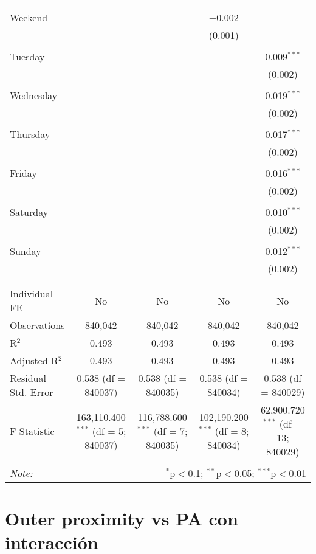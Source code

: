 \documentclass[
]{article}
\begin{document}
\begin{table}[!htbp]
{\begin{tabular}{@{\extracolsep{5pt}}lcccc}
  & & & & \\ 
 Weekend &  &  & $-$0.002 &  \\ 
  &  &  & (0.001) &  \\ 
  & & & & \\ 
 Tuesday &  &  &  & 0.009$^{***}$ \\ 
  &  &  &  & (0.002) \\ 
  & & & & \\ 
 Wednesday &  &  &  & 0.019$^{***}$ \\ 
  &  &  &  & (0.002) \\ 
  & & & & \\ 
 Thursday &  &  &  & 0.017$^{***}$ \\ 
  &  &  &  & (0.002) \\ 
  & & & & \\ 
 Friday &  &  &  & 0.016$^{***}$ \\ 
  &  &  &  & (0.002) \\ 
  & & & & \\ 
 Saturday &  &  &  & 0.010$^{***}$ \\ 
  &  &  &  & (0.002) \\ 
  & & & & \\ 
 Sunday &  &  &  & 0.012$^{***}$ \\ 
  &  &  &  & (0.002) \\ 
  & & & & \\ 
\hline \\[-1.8ex] 
Individual FE & No & No & No & No \\ 
Observations & 840,042 & 840,042 & 840,042 & 840,042 \\ 
R$^{2}$ & 0.493 & 0.493 & 0.493 & 0.493 \\ 
Adjusted R$^{2}$ & 0.493 & 0.493 & 0.493 & 0.493 \\ 
Residual Std. Error & 0.538 (df = 840037) & 0.538 (df = 840035) & 0.538 (df = 840034) & 0.538 (df = 840029) \\ 
F Statistic & 163,110.400$^{***}$ (df = 5; 840037) & 116,788.600$^{***}$ (df = 7; 840035) & 102,190.200$^{***}$ (df = 8; 840034) & 62,900.720$^{***}$ (df = 13; 840029) \\ 
\hline 
\hline \\[-1.8ex] 
\textit{Note:}  & \multicolumn{4}{r}{$^{*}$p$<$0.1; $^{**}$p$<$0.05; $^{***}$p$<$0.01} \\ 
\end{tabular}
} 
\end{table} 
\newpage
\section{Outer proximity vs PA con interacción}
\end{document}
